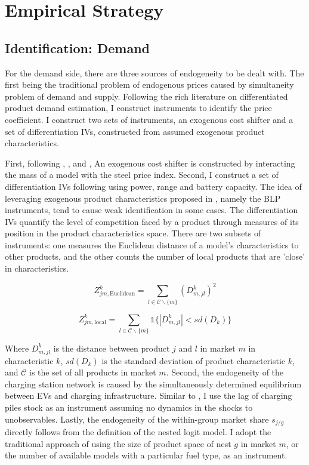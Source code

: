 \documentclass[12pt]{article}
\begin{document}
\section{Empirical Strategy}
    \subsection{Identification: Demand}
\hspace*{\parindent} For the demand side, there are three sources of endogeneity to be dealt with. 
The first being the traditional problem of endogenous prices caused by simultaneity problem of demand and supply.
Following the rich literature on differentiated product demand estimation, I construct instruments to identify the price coefficient.
I construct two sets of instruments, an exogenous cost shifter and a set of differentiation IVs, 
constructed from assumed exogenous product characteristics.

First, following \citet{springel_network_2021}, \citet{barwick_attribute-based_2024}, and \citet{remmy_adjustable_2024}, 
An exogenous cost shifter is constructed by interacting the mass of a model with the steel price index.
Second, I construct a set of differentiation IVs following \citet{gandhi_measuring_2020} using power, range and battery capacity. 
The idea of leveraging exogenous product characteristics proposed in \citet{berry_automobile_1995}, namely the BLP instruments, tend to cause weak identification in some cases. 
The differentiation IVs quantify the level of competition faced by a product through measures of its position in the product characteristics space.
There are two subsets of instruments: one measures the Euclidean distance of a model's characteristics to other products, 
and the other counts the number of local products that are 'close' in characteristics.

\begin{equation}
Z_{jm,\text{Euclidean}}^{k} = \sum_{l \in \mathcal{C}\backslash\{m\}} (D_{m,jl}^{k})^2
\end{equation}

\begin{equation}
Z_{jm,\text{local}}^{k} = \sum_{l \in \mathcal{C}\backslash\{m\}} \mathds{1}\{|D_{m,jl}^{k}| < \textit{sd}(D_{k})\}
\end{equation}

Where $D_{m,jl}^{k}$ is the distance between product $j$ and $l$ in market $m$ in characteristic $k$,
$\textit{sd}(D_k)$ is the standard deviation of product characteristic $k$, and $\mathcal{C}$ is the set of all products in market $m$.
Second, the endogeneity of the charging station network is caused by the simultaneously determined equilibrium between EVs and charging infrastructure.
Similar to \citet{li_compatibility_2023}, I use the lag of charging piles stock as an instrument assuming no dynamics in the shocks to unobservables.
Lastly, the endogeneity of the within-group market share $s_{j/g}$ directly follows from the definition of the nested logit model.
I adopt the traditional approach of using the size of product space of nest $g$ in market $m$, or the number of available models with a particular fuel type, as an instrument.
\end{document}
